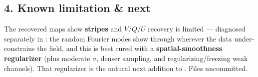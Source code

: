 \subsection*{4. Known limitation \& next}
The recovered maps show \textbf{stripes} and $V/Q/U$ recovery is limited --- diagnosed separately in
: the random Fourier modes show through wherever the data under-constrains the
field, and this is best cured with a \textbf{spatial-smoothness regularizer} (plus moderate $\sigma$, denser
sampling, and regularizing/freezing weak channels). That regularizer is the natural next addition to
. Files uncommitted.



